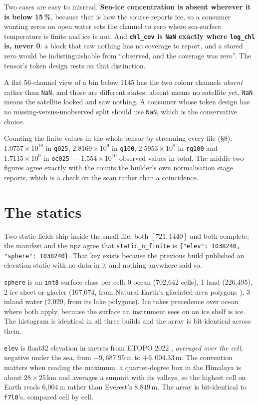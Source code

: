 \documentclass[10pt]{article}
\newcommand{\code}[1]{\texttt{#1}}
\begin{document}
Two cases are easy to misread. \textbf{Sea-ice concentration is absent
wherever it is below 15\,\%}, because that is how the source reports ice, so a
consumer wanting zeros on open water sets the channel to zero where
sea-surface temperature is finite and ice is not. And \textbf{\code{chl\_cov}
is \code{NaN} exactly where \code{log\_chl} is, never 0}: a block that saw
nothing has no coverage to report, and a stored zero would be
indistinguishable from ``observed, and the coverage was zero''. The tensor's
token design rests on that distinction.

A flat 56-channel view of a bin below 1145 has the two colour channels
\emph{absent} rather than \code{NaN}, and those are different states: absent
means no satellite yet, \code{NaN} means the satellite looked and saw nothing.
A consumer whose token design has no missing-versus-unobserved split should
use \code{NaN}, which is the conservative choice.

Counting the finite values in the whole tensor by streaming every file (\S8):
$1.0757\times10^{10}$ in \code{g025}, $2.8169\times10^{9}$ in \code{g100},
$2.5953\times10^{8}$ in \code{rg100} and $1.7115\times10^{9}$ in
\code{oc025} --- $1.554\times10^{10}$ observed values in total. The middle two
figures agree exactly with the counts the builder's own normalisation stage
reports, which is a check on the scan rather than a coincidence.

\section{The statics}

Two static fields ship inside the small file, both $[721, 1440]$ and both
complete: the manifest and the npz agree that \code{static\_n\_finite} is
\code{\{"elev": 1038240, "sphere": 1038240\}}. That key exists because the
previous build published an elevation static with no data in it and nothing
anywhere said so.

\code{sphere} is an \code{int8} surface class per cell: 0 ocean (702,642
cells), 1 land (226,495), 2 ice sheet or glacier (107,074, from Natural
Earth's glaciated-area polygons \cite{ne}), 3 inland water (2,029, from its
lake polygons). Ice takes precedence over ocean where both apply, because the
surface an instrument sees on an ice shelf is ice. The histogram is identical
in all three builds and the array is bit-identical across them.

\code{elev} is float32 elevation in metres from ETOPO 2022 \cite{etopo},
\emph{averaged over the cell}, negative under the sea, from $-9{,}687.95$\,m
to $+6{,}004.33$\,m. The convention matters when reading the maximum: a
quarter-degree box in the Himalaya is about $28\times25$\,km and averages a
summit with its valleys, so the highest cell on Earth reads 6,004\,m rather
than Everest's 8,849\,m. The array is bit-identical to \code{f7l0}'s, compared
cell by cell.
\end{document}
